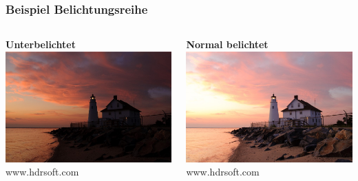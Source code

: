 \documentclass{beamer}
\begin{document}
	\begin{frame}
	\frametitle{Beispiel Belichtungsreihe}
	\begin{columns}
		\begin{column}{0.33\textwidth}
			\begin{center}
				\textbf{Unterbelichtet}\\
				\vspace{5mm}
				\includegraphics[scale=0.4]{img/bild10.jpg}
				\tiny www.hdrsoft.com
			\end{center}
		\end{column}
		\begin{column}{0.33\textwidth}
			\begin{center}
				\textbf{Normal belichtet} \\
				\vspace{5mm}
				\includegraphics[scale=0.4]{img/bild11.jpg}
				\tiny www.hdrsoft.com

\end{center}
\end{column}
\end{columns}
\end{frame}
\end{document}
